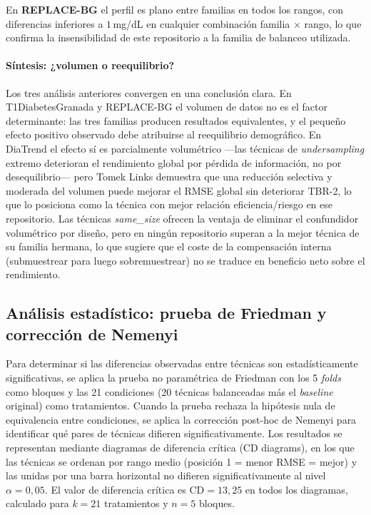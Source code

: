 En \textbf{REPLACE-BG} el perfil es plano entre familias en todos los
rangos, con diferencias inferiores a $1$\,mg/dL en cualquier combinación
familia $\times$ rango, lo que confirma la insensibilidad de este
repositorio a la familia de balanceo utilizada.

\paragraph{Síntesis: ¿volumen o reequilibrio?}
Los tres análisis anteriores convergen en una conclusión clara. En
T1DiabetesGranada y REPLACE-BG el volumen de datos no es el factor
determinante: las tres familias producen resultados equivalentes, y el
pequeño efecto positivo observado debe atribuirse al reequilibrio demográfico.
En DiaTrend el efecto sí es parcialmente volumétrico ---las técnicas de
\textit{undersampling} extremo deterioran el rendimiento global por pérdida
de información, no por desequilibrio--- pero Tomek Links demuestra que una
reducción selectiva y moderada del volumen puede mejorar el RMSE global sin
deteriorar TBR-2, lo que lo posiciona como la técnica con mejor relación
eficiencia/riesgo en ese repositorio. Las técnicas \textit{same\_size}
ofrecen la ventaja de eliminar el confundidor volumétrico por diseño, pero
en ningún repositorio superan a la mejor técnica de su familia hermana,
lo que sugiere que el coste de la compensación interna (submuestrear para
luego sobremuestrear) no se traduce en beneficio neto sobre el rendimiento.


\subsection{Análisis estadístico: prueba de Friedman y corrección de Nemenyi}
\label{subsec:analisis_estadistico}

Para determinar si las diferencias observadas entre técnicas son
estadísticamente significativas, se aplica la prueba no paramétrica de
Friedman con los 5 \textit{folds} como bloques y las 21 condiciones
(20 técnicas balanceadas más el \textit{baseline} original) como
tratamientos. Cuando la prueba rechaza la hipótesis nula de equivalencia
entre condiciones, se aplica la corrección post-hoc de Nemenyi para
identificar qué pares de técnicas difieren significativamente. Los
resultados se representan mediante diagramas de diferencia crítica
(CD diagrams), en los que las técnicas se ordenan por rango medio
(posición 1 = menor RMSE = mejor) y las unidas por una barra horizontal
no difieren significativamente al nivel $\alpha = 0{,}05$. El valor de
diferencia crítica es $\text{CD} = 13{,}25$ en todos los diagramas,
calculado para $k = 21$ tratamientos y $n = 5$ bloques.

